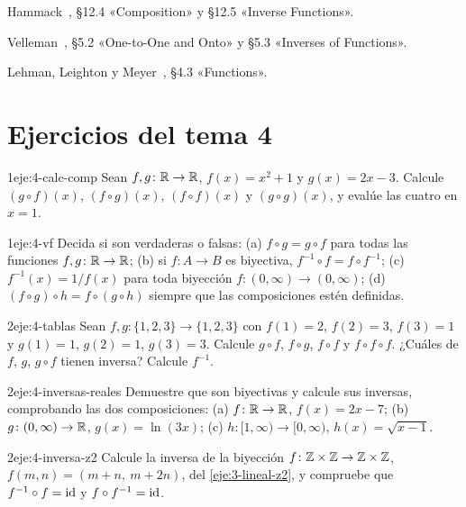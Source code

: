 \begin{lecturas}
\item Hammack~\cite{hammack}, §12.4 «Composition» y §12.5 «Inverse Functions».
\item Velleman~\cite{velleman}, §5.2 «One-to-One and Onto» y §5.3 «Inverses of Functions».
\item Lehman, Leighton y Meyer~\cite{mcs}, §4.3 «Functions».
\end{lecturas}

\section*{Ejercicios del tema 4}

\begin{ejercicio}{1}{eje:4-calc-comp}
Sean $f,g\colon\mathbb{R}\to\mathbb{R}$, $f(x)=x^{2}+1$ y $g(x)=2x-3$. Calcule $(g\circ f)(x)$, $(f\circ g)(x)$, $(f\circ f)(x)$ y $(g\circ g)(x)$, y evalúe las cuatro en $x=1$.
\end{ejercicio}

\begin{ejercicio}{1}{eje:4-vf}
Decida si son verdaderas o falsas: (a) $f\circ g=g\circ f$ para todas las funciones $f,g\colon\mathbb{R}\to\mathbb{R}$; (b) si $f\colon A\to B$ es biyectiva, $f^{-1}\circ f=f\circ f^{-1}$; (c) $f^{-1}(x)=1/f(x)$ para toda biyección $f\colon(0,\infty)\to(0,\infty)$; (d) $(f\circ g)\circ h=f\circ(g\circ h)$ siempre que las composiciones estén definidas.
\end{ejercicio}

\begin{ejercicio}{2}{eje:4-tablas}
Sean $f,g\colon\{1,2,3\}\to\{1,2,3\}$ con $f(1)=2$, $f(2)=3$, $f(3)=1$ y $g(1)=1$, $g(2)=1$, $g(3)=3$. Calcule $g\circ f$, $f\circ g$, $f\circ f$ y $f\circ f\circ f$. ¿Cuáles de $f$, $g$, $g\circ f$ tienen inversa? Calcule $f^{-1}$.
\end{ejercicio}

\begin{ejercicio}{2}{eje:4-inversas-reales}
Demuestre que son biyectivas y calcule sus inversas, comprobando las dos composiciones: (a) $f\colon\mathbb{R}\to\mathbb{R}$, $f(x)=2x-7$; (b) $g\colon(0,\infty)\to\mathbb{R}$, $g(x)=\ln(3x)$; (c) $h\colon[1,\infty)\to[0,\infty)$, $h(x)=\sqrt{x-1}$.
\end{ejercicio}

\begin{ejercicio}{2}{eje:4-inversa-z2}
Calcule la inversa de la biyección $f\colon\mathbb{Z}\times\mathbb{Z}\to\mathbb{Z}\times\mathbb{Z}$, $f(m,n)=(m+n,\ m+2n)$, del \cref{eje:3-lineal-z2}, y compruebe que $f^{-1}\circ f=\mathrm{id}$ y $f\circ f^{-1}=\mathrm{id}$.
\end{ejercicio}

